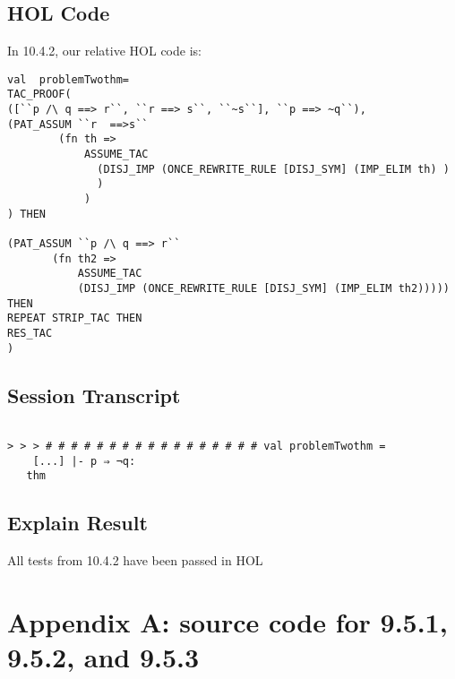 \documentclass{report}
\begin{document}
\section{HOL Code}
\label{HOl Code 1042}
In 10.4.2, our relative HOL code is:
\begin{lstlisting}[frame=trBL]
val  problemTwothm=
TAC_PROOF(
([``p /\ q ==> r``, ``r ==> s``, ``~s``], ``p ==> ~q``),
(PAT_ASSUM ``r  ==>s``
	    (fn th =>
     	    ASSUME_TAC
     	      (DISJ_IMP (ONCE_REWRITE_RULE [DISJ_SYM] (IMP_ELIM th) )
              )
            )
) THEN

(PAT_ASSUM ``p /\ q ==> r``
	   (fn th2 =>
     	   ASSUME_TAC
     	   (DISJ_IMP (ONCE_REWRITE_RULE [DISJ_SYM] (IMP_ELIM th2))))) THEN
REPEAT STRIP_TAC THEN
RES_TAC
)
\end{lstlisting}

\section{Session Transcript}
\label{Session Trans 1041}
\setcounter{sessioncount}{0}
\begin{session}
  \begin{scriptsize}
\begin{verbatim}

> > > # # # # # # # # # # # # # # # # # val problemTwothm =
    [...] |- p ⇒ ¬q:
   thm
\end{verbatim}
  \end{scriptsize}
\end{session}
\section{Explain Result}
\label{explain result 1042}
All tests from 10.4.2 have been passed in HOL


\chapter{Appendix A: source code for 9.5.1, 9.5.2, and 9.5.3}


%
\end{document}
